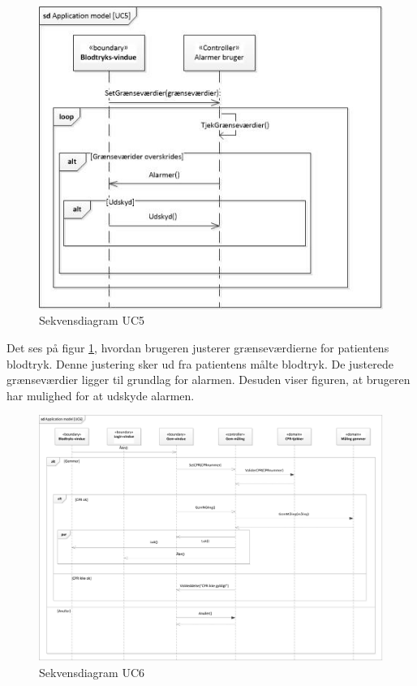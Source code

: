 \begin{figure}[H]
	\includegraphics[width=1\textwidth]{Figurer/ISE/sdAppModelUC5}
	\caption{Sekvensdiagram UC5}
	\label{sd UC5}
\end{figure}

Det ses på figur \ref{sd UC5}, hvordan brugeren justerer grænseværdierne for patientens blodtryk. Denne justering sker ud fra patientens målte blodtryk. De justerede grænseværdier ligger til grundlag for alarmen. Desuden viser figuren, at brugeren har mulighed for at udskyde alarmen.

\begin{figure}[H]
	\includegraphics[width=1\textwidth]{Figurer/ISE/sdAppModelUC6}
	\caption{Sekvensdiagram UC6}
	\label{sd UC6}
\end{figure}

